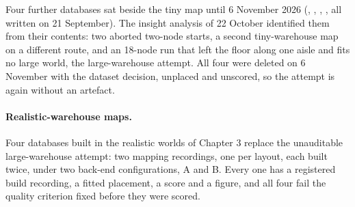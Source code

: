 \documentclass[11pt,a4paper,notitlepage]{report}
\begin{document}
\begin{queried}
Four further databases sat beside the tiny map until 6 November 2026
(, , ,
, all written on 21 September). The insight analysis of
22 October identified them from their contents: two aborted two-node starts,
a second tiny-warehouse map on a different route, and an 18-node run that
left the floor along one aisle and fits no large world, the large-warehouse
attempt. All four were deleted on 6 November with the dataset decision,
unplaced and unscored, so the attempt is again without an artefact.
\end{queried}

\paragraph{Realistic-warehouse maps.} Four databases built in the realistic
worlds of Chapter 3 replace the unauditable large-warehouse attempt: two
mapping recordings, one per layout, each built twice, under two back-end configurations, A and B. Every one has a
registered build recording, a fitted placement, a score and a figure, and all
four fail the quality criterion fixed before they were scored.
\end{document}
